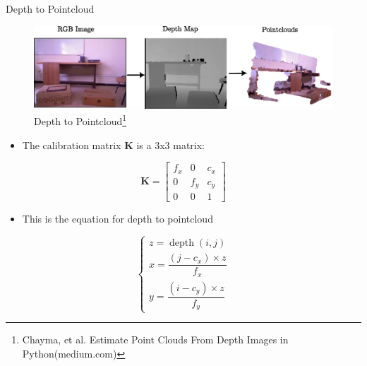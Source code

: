 \documentclass[10pt]{beamer}
\begin{document}
\begin{frame}{Depth to Pointcloud}
    \vspace{-0.4cm}
    \begin{figure}[!ht]
        \centering
        \includegraphics[scale=0.60]{point_cloud.eps}
        \caption{Depth to Pointcloud\footnote{Chayma, et al. Estimate Point Clouds From Depth Images in Python(medium.com)}}
    \end{figure}

    \begin{minipage}{0.47\textwidth}
        \begin{itemize}
            \item The calibration matrix $\mathbf{K}$ is a 3x3 matrix:
        \end{itemize}

        \begin{equation*}
            \mathbf{K} =
            \begin{bmatrix}
                f_x & 0   & c_x \\
                0   & f_y & c_y \\
                0   & 0   & 1
            \end{bmatrix}
            \label{eq:camera_mat}
        \end{equation*}
    \end{minipage}
    \pause
    \begin{minipage}{0.47\textwidth}
        \begin{itemize}
            \item This is the equation for depth to pointcloud
        \end{itemize}
        \begin{equation*}
            \left\{\begin{array}{l}
                z=\operatorname{depth}(i, j)               \\

                x=\dfrac{\left(j-c_x\right) \times z}{f_x} \\
                y=\dfrac{\left(i-c_y\right) \times z}{f_y}
            \end{array}\right.
        \end{equation*}
    \end{minipage}

\end{frame}
\end{document}
